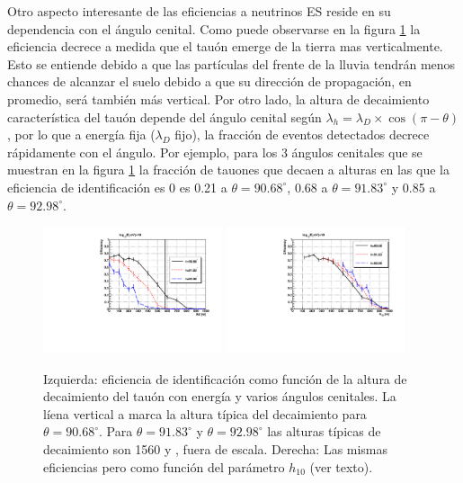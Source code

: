 	Otro aspecto interesante de las eficiencias a neutrinos ES reside en su dependencia con el ángulo cenital.
	Como puede observarse en la figura \ref{fig:effES_th} la eficiencia decrece a medida que el tauón emerge de la tierra mas verticalmente.
	Esto se entiende debido a que las partículas del frente de la lluvia tendrán menos chances de alcanzar el suelo debido a que su dirección de propagación, en promedio, será también más vertical.
	Por otro lado, la altura de decaimiento característica del tauón depende del ángulo cenital según $\lambda_h=\lambda_D\times\cos(\pi-\theta)$, por lo que a energía fija ($\lambda_D$ fijo), la fracción de eventos detectados decrece rápidamente con el ángulo.
	Por ejemplo, para los 3 ángulos cenitales que se muestran en la figura \ref{fig:effES_th} la fracción de tauones que decaen a alturas en las que la eficiencia de identificación es 0 es 0.21 a $\theta=90.68^\circ$, 0.68 a $\theta=91.83^\circ$ y 0.85 a $\theta=92.98^\circ$.
	\begin{figure}[ht!]
		\begin{center}
			\includegraphics[width=0.47\textwidth]{fig/resultadosAuger/eff_multiTheta_forThesis}
			\hfill
			\includegraphics[width=0.47\textwidth]{fig/resultadosAuger/eff_multTheta_h10_forThesis}
			\caption{Izquierda: eficiencia de identificación como función de la altura de decaimiento del tauón con energía  y varios ángulos cenitales. La líena vertical a  marca la altura típica del decaimiento para $\theta=90.68^\circ$. Para $\theta=91.83^\circ$ y $\theta=92.98^\circ$ las alturas típicas de decaimiento son 1560 y , fuera de escala.
			Derecha: Las mismas eficiencias pero como función del parámetro $h_{10}$ (ver texto).}
			\label{fig:effES_th}
		\end{center}
	\end{figure}
	

